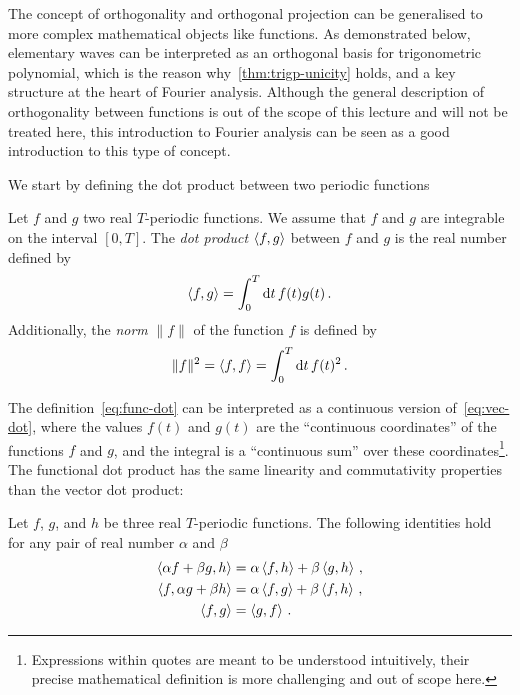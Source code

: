 The concept of orthogonality and orthogonal projection can be generalised to more complex
mathematical objects like functions. As demonstrated below, elementary waves can be
interpreted as an orthogonal basis for trigonometric polynomial, which is the reason
why~\cref{thm:trigp-unicity} holds, and a key structure at the heart of Fourier analysis.
Although the general description of orthogonality between functions is out of the scope of
this lecture and will not be treated here, this introduction to Fourier analysis can be
seen as a good introduction to this type of concept.

We start by defining the dot product between two periodic functions
\begin{definition}
  Let $f$ and $g$ two real $T$-periodic functions. We assume that $f$ and $g$ are
  integrable on the interval $[0,T]$. The \emph{dot product} $\braket{f,g}$ between $f$
  and $g$ is the real number defined by
  \begin{equation}
    \braket{f,g}=\int_{0}^{T}\mathrm{d} t\, f(t)g(t)\,.\label{eq:func-dot}
  \end{equation}
  Additionally, the \emph{norm} $\|f\|$ of the function $f$ is defined by
  \begin{equation}
    \|f\|^2=\braket{f,f}=\int_{0}^{T}\mathrm{d} t\, f(t)^2\,.
  \end{equation}
\end{definition}
The definition~\cref{eq:func-dot} can be interpreted as a continuous version
of~\cref{eq:vec-dot}, where the values $f(t)$ and $g(t)$ are the ``continuous
coordinates'' of the functions $f$ and $g$, and the integral is a ``continuous sum'' over
these coordinates\footnote{Expressions within quotes are meant to be understood
  intuitively, their precise mathematical definition is more challenging and out of scope
here.}. The functional dot product has the same linearity and commutativity properties
than the vector dot product:
\begin{proposition}
  Let $f$, $g$, and $h$ be three real $T$-periodic functions. The following identities
  hold for any pair of real number $\alpha$ and $\beta$
  \begin{align}
    \braket{\alpha f+\beta g,h}&=\alpha\braket{f,h}+\beta\braket{g,h}\,,\\
    \braket{f,\alpha g+\beta h}&=\alpha\braket{f,g}+\beta\braket{f,h}\,,\\
    \braket{f,g}&=\braket{g,f}\,.
  \end{align}
\end{proposition}
